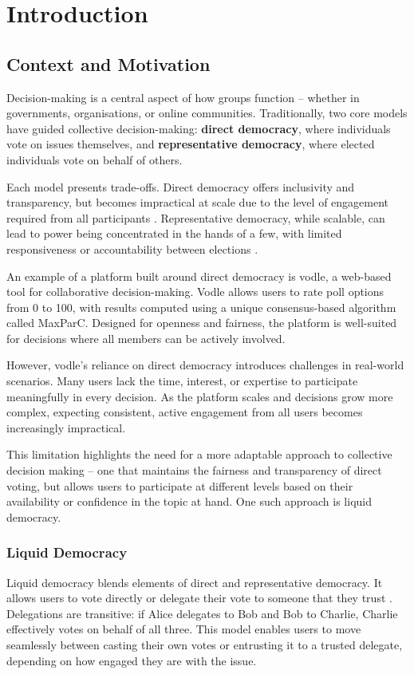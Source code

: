 \chapter{Introduction}\label{ch:introduction}

\section{Context and Motivation}

Decision-making is a central aspect of how groups function -- whether in governments, organisations, or online communities. Traditionally, two core models have guided collective decision-making: \textbf{direct democracy}, where individuals vote on issues themselves, and \textbf{representative democracy}, where elected individuals vote on behalf of others.

Each model presents trade-offs. Direct democracy offers inclusivity and transparency, but becomes impractical at scale due to the level of engagement required from all participants \citep{ford_delegative_2002}. Representative democracy, while scalable, can lead to power being concentrated in the hands of a few, with limited responsiveness or accountability between elections \citep{blum_liquid_2016}.

An example of a platform built around direct democracy is vodle, a web-based tool for collaborative decision-making. Vodle allows users to rate poll options from 0 to 100, with results computed using a unique consensus-based algorithm called MaxParC. Designed for openness and fairness, the platform is well-suited for decisions where all members can be actively involved.

However, vodle's reliance on direct democracy introduces challenges in real-world scenarios. Many users lack the time, interest, or expertise to participate meaningfully in every decision. As the platform scales and decisions grow more complex, expecting consistent, active engagement from all users becomes increasingly impractical.

This limitation highlights the need for a more adaptable approach to collective decision making -- one that maintains the fairness and transparency of direct voting, but allows users to participate at different levels based on their availability or confidence in the topic at hand.
One such approach is liquid democracy.

\subsection{Liquid Democracy}
Liquid democracy blends elements of direct and representative democracy. It allows users to vote directly or delegate their vote to someone that they trust \citep{blum_liquid_2016}. Delegations are transitive: if Alice delegates to Bob and Bob to Charlie, Charlie effectively votes on behalf of all three. This model enables users to move seamlessly between casting their own votes or entrusting it to a trusted delegate, depending on how engaged they are with the issue.

